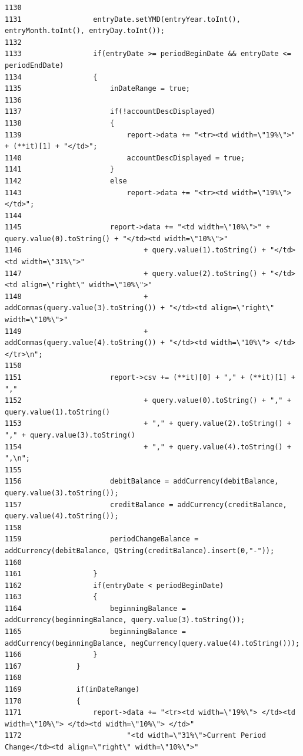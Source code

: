 \begin{verbatim}
1130                 
1131                 entryDate.setYMD(entryYear.toInt(), entryMonth.toInt(), entryDay.toInt());
1132                 
1133                 if(entryDate >= periodBeginDate && entryDate <= periodEndDate)
1134                 {
1135                     inDateRange = true;
1136                     
1137                     if(!accountDescDisplayed)
1138                     {
1139                         report->data += "<tr><td width=\"19%\">" + (**it)[1] + "</td>";
1140                         accountDescDisplayed = true;
1141                     }
1142                     else
1143                         report->data += "<tr><td width=\"19%\"> </td>";
1144                     
1145                     report->data += "<td width=\"10%\">" + query.value(0).toString() + "</td><td width=\"10%\">"
1146                             + query.value(1).toString() + "</td><td width=\"31%\">"
1147                             + query.value(2).toString() + "</td><td align=\"right\" width=\"10%\">"
1148                             + addCommas(query.value(3).toString()) + "</td><td align=\"right\" width=\"10%\">"
1149                             + addCommas(query.value(4).toString()) + "</td><td width=\"10%\"> </td></tr>\n";
1150                     
1151                     report->csv += (**it)[0] + "," + (**it)[1] + ","
1152                             + query.value(0).toString() + "," + query.value(1).toString()
1153                             + "," + query.value(2).toString() + "," + query.value(3).toString()
1154                             + "," + query.value(4).toString() + ",\n";
1155                     
1156                     debitBalance = addCurrency(debitBalance, query.value(3).toString());
1157                     creditBalance = addCurrency(creditBalance, query.value(4).toString());
1158                     
1159                     periodChangeBalance = addCurrency(debitBalance, QString(creditBalance).insert(0,"-"));
1160             
1161                 }
1162                 if(entryDate < periodBeginDate)
1163                 {
1164                     beginningBalance = addCurrency(beginningBalance, query.value(3).toString());
1165                     beginningBalance = addCurrency(beginningBalance, negCurrency(query.value(4).toString()));
1166                 }
1167             }
1168             
1169             if(inDateRange)
1170             {   
1171                 report->data += "<tr><td width=\"19%\"> </td><td width=\"10%\"> </td><td width=\"10%\"> </td>"
1172                         "<td width=\"31%\">Current Period Change</td><td align=\"right\" width=\"10%\">"

\end{verbatim}
